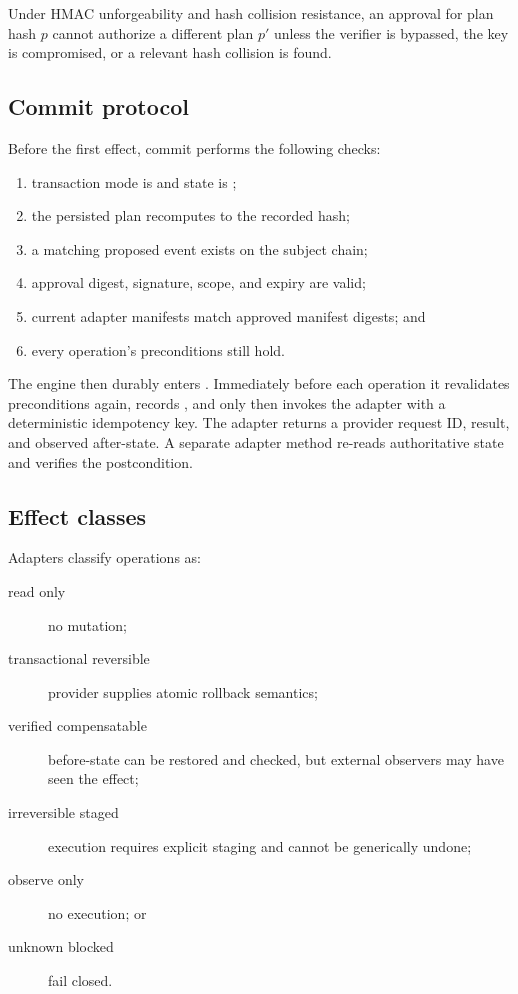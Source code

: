  Under HMAC unforgeability and hash collision resistance, an approval for plan hash $p$ cannot authorize a different plan $p'$ unless the verifier is bypassed, the key is compromised, or a relevant hash collision is found.

\subsection{Commit protocol}

Before the first effect, commit performs the following checks:

\begin{enumerate}
  \item transaction mode is  and state is ;
  \item the persisted plan recomputes to the recorded hash;
  \item a matching proposed event exists on the subject chain;
  \item approval digest, signature, scope, and expiry are valid;
  \item current adapter manifests match approved manifest digests; and
  \item every operation's preconditions still hold.
\end{enumerate}

The engine then durably enters . Immediately before each operation it revalidates preconditions again, records , and only then invokes the adapter with a deterministic idempotency key. The adapter returns a provider request ID, result, and observed after-state. A separate adapter method re-reads authoritative state and verifies the postcondition.



\subsection{Effect classes}

Adapters classify operations as:

\begin{description}
  \item[read only] no mutation;
  \item[transactional reversible] provider supplies atomic rollback semantics;
  \item[verified compensatable] before-state can be restored and checked, but external observers may have seen the effect;
  \item[irreversible staged] execution requires explicit staging and cannot be generically undone;
  \item[observe only] no execution; or
  \item[unknown blocked] fail closed.
\end{description}

